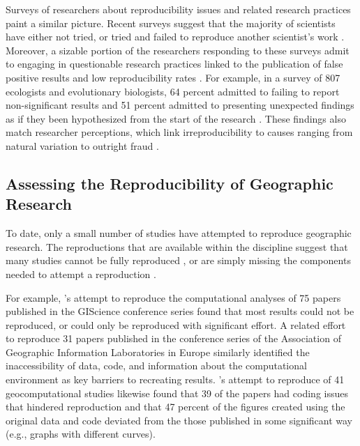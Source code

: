 \documentclass[]{interact}
\theoremstyle{plain}%
\theoremstyle{definition}
\theoremstyle{remark}
\begin{document}
Surveys of researchers about reproducibility issues and related research practices paint a similar picture. 
Recent surveys suggest that the majority of scientists have either not tried, or tried and failed to reproduce another scientist's work \citep{baker20161, boulbes2018survey}. 
Moreover, a sizable portion of the researchers responding to these surveys admit to engaging in questionable research practices linked to the publication of false positive results and low reproducibility rates \citep{fanelli2009many, fraser2018questionable}.
For example, in a survey of 807 ecologists and evolutionary biologists, 64 percent admitted to failing to report non-significant results and 51 percent admitted to presenting unexpected findings as if they been hypothesized from the start of the research \citep{fraser2018questionable}.  
These findings also match researcher perceptions, which link irreproducibility to causes ranging from natural variation to outright fraud \citep{ranstam2000fraud, anderson2007normative, baker20161}. 


\subsection*{Assessing the Reproducibility of Geographic Research}
To date, only a small number of studies have attempted to reproduce geographic research.
The reproductions that are available within the discipline suggest that many studies cannot be fully reproduced \citep{Kedron2021ssrn, nust2018, ostermann2021}, or are simply missing the components needed to attempt a reproduction \citep{Kedron_VijayanRP, konkol2019, ostermann2021}.




For example, \citet{ostermann2021}'s attempt to reproduce the computational analyses of 75 papers published in the GIScience conference series found that most results could not be reproduced, or could only be reproduced with significant effort. 
A related effort to reproduce 31 papers published in the conference series of the Association of Geographic Information Laboratories in Europe \citep{Nust_AGILE_2020, Nust2021AGILE, Nust_AGILE_2022} similarly identified the inaccessibility of data, code, and information about the computational environment as key barriers to recreating results. 
\citet{konkol2019}'s attempt to reproduce of 41 geocomputational studies likewise found that 39 of the papers had coding issues that hindered reproduction and that 47 percent of the figures created using the original data and code deviated from the those published in some significant way (e.g., graphs with different curves). 
\end{document}

